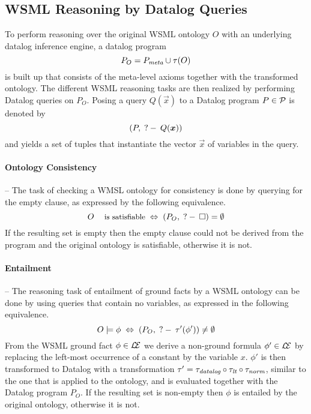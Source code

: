 \subsection{WSML Reasoning by Datalog Queries}

To perform reasoning over the original WSML ontology $O$ with an
underlying datalog inference engine, a datalog program
\begin{displaymath}
    P_O = \mlaxioms \cup \tau(O)
\end{displaymath}
is built up that consists of the meta-level axioms together with
the transformed ontology. The different WSML reasoning tasks are
then realized by performing Datalog queries on $P_O$. Posing a
query $Q(\vec{x})$ to a Datalog program $P \in \P$ is denoted by
$$(P,\qury Q(\vec{x}))$$ and yields a set of tuples that instantiate
the vector $\vec{x}$ of variables in the query.

\paragraph{Ontology Consistency} -- The task of checking a WMSL
ontology for consistency is done by querying for the empty clause,
as expressed by the following equivalence.
\begin{displaymath}
    O \; \textrm{\footnotesize{is satisfiable}} \; \Leftrightarrow \; (P_O , \qury \square) =
    \emptyset
\end{displaymath}
If the resulting set is empty then the empty clause could not be
derived from the program and the original ontology is satisfiable,
otherwise it is not.

\paragraph{Entailment} -- The reasoning task of entailment of
ground facts by a WSML ontology can be done by using queries that
contain no variables, as expressed in the following equivalence.
\begin{displaymath}
    O \models \phi \; \Leftrightarrow \; (P_O, \qury
    \tau'(\phi')) \not= \emptyset
\end{displaymath}
From the WSML ground fact $\phi \in \LE$ we derive a non-ground
formula $\phi' \in \LE$ by replacing the left-most occurrence of a
constant by the variable $x$. $\phi'$ is then transformed to
Datalog with a transformation $\tau' = \transdlog \circ \translt
\circ \transnorm$, similar to the one that is applied to the
ontology, and is evaluated together with the Datalog program
$P_O$. If the resulting set is non-empty then $\phi$ is entailed
by the original ontology, otherwise it is not.

